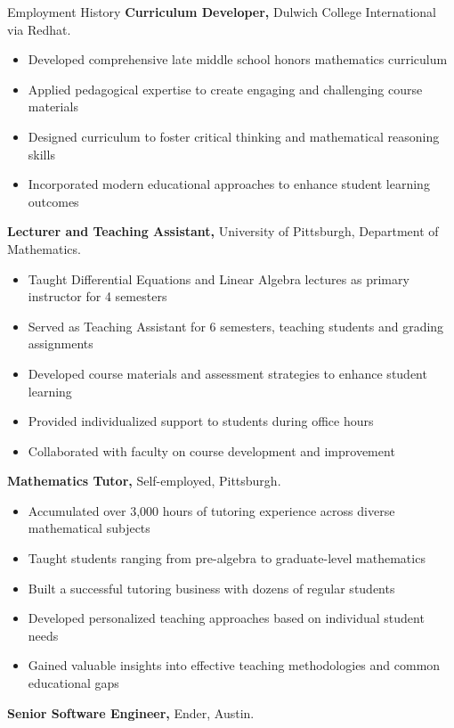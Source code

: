 \begin{rubric}{Employment History}
\entry*[2018]%
	\textbf{Curriculum Developer,} Dulwich College International via Redhat.
	\begin{itemize}
		\item Developed comprehensive late middle school honors mathematics curriculum
		\item Applied pedagogical expertise to create engaging and challenging course materials
		\item Designed curriculum to foster critical thinking and mathematical reasoning skills
		\item Incorporated modern educational approaches to enhance student learning outcomes
	\end{itemize}
%
%
	\textbf{Lecturer and Teaching Assistant,} University of Pittsburgh, Department of Mathematics.
	\begin{itemize}
		\item Taught Differential Equations and Linear Algebra lectures as primary instructor for 4 semesters
		\item Served as Teaching Assistant for 6 semesters, teaching students and grading assignments
		\item Developed course materials and assessment strategies to enhance student learning
		\item Provided individualized support to students during office hours
		\item Collaborated with faculty on course development and improvement
	\end{itemize}
%
%
	\textbf{Mathematics Tutor,} Self-employed, Pittsburgh.
	\begin{itemize}
		\item Accumulated over 3,000 hours of tutoring experience across diverse mathematical subjects
		\item Taught students ranging from pre-algebra to graduate-level mathematics
		\item Built a successful tutoring business with dozens of regular students
		\item Developed personalized teaching approaches based on individual student needs
		\item Gained valuable insights into effective teaching methodologies and common educational gaps
	\end{itemize}
%
%
	\textbf{Senior Software Engineer,} Ender, Austin.

\end{rubric}
